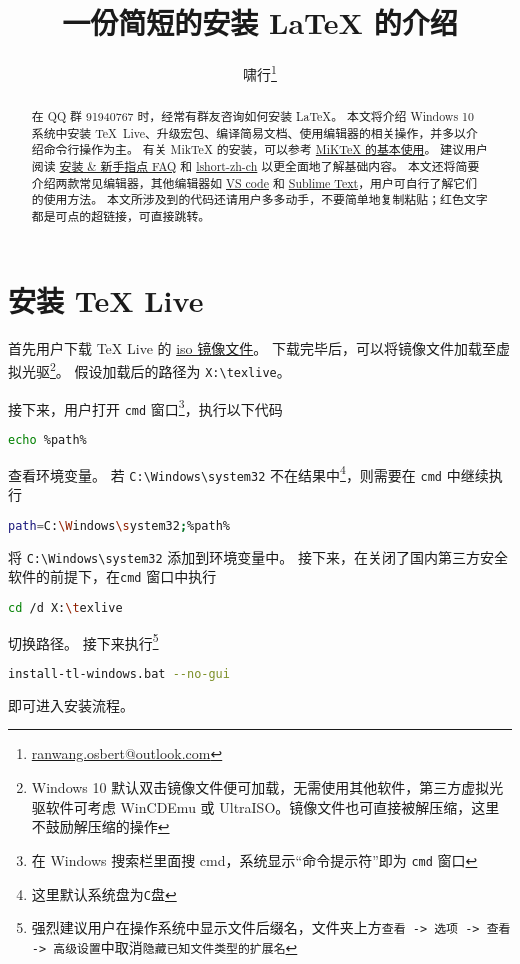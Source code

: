 \documentclass{ctexart}
\title{\bfseries 一份简短的安装 \LaTeX{} 的介绍}
\author{啸行\thanks{\url{ranwang.osbert@outlook.com}}}
\begin{document}
  
\maketitle

\begin{abstract}
在 QQ 群 91940767 时，经常有群友咨询如何安装 \LaTeX{}。
本文将介绍 Windows 10 系统中安装 \TeX{}~Live、升级宏包、编译简易文档、使用编辑器的相关操作，并多以介绍命令行操作为主。
有关 Mik\TeX{} 的安装，可以参考 \href{https://camuseblog.top/2019-03-02-/MiKTeX/}{MiK\TeX{} 的基本使用}。
建议用户阅读 \href{http://www.latexstudio.net/archives/11469.html}{\LaTeXe{} 安装 \& 新手指点 FAQ} 和 \href{http://mirrors.ctan.org/info/lshort/chinese/lshort-zh-cn.pdf}{lshort-zh-ch} 以更全面地了解基础内容。
本文还将简要介绍两款常见编辑器，其他编辑器如 \href{https://github.com/EthanDeng/vscode-latex}{VS code} 和 \href{https://github.com/EthanDeng/sublime-text-latex}{Sublime Text}，用户可自行了解它们的使用方法。
本文所涉及到的代码还请用户多多动手，不要简单地复制粘贴；红色文字都是可点的超链接，可直接跳转。
\end{abstract}

\section{安装 \TeX{} Live}
首先用户下载 \TeX{} Live 的 \href{http://mirrors.ctan.org/systems/texlive/Images/texlive.iso}{iso 镜像文件}。
下载完毕后，可以将镜像文件加载至虚拟光驱\footnote{Windows 10 默认双击镜像文件便可加载，无需使用其他软件，第三方虚拟光驱软件可考虑 WinCDEmu 或 UltraISO。镜像文件也可直接被解压缩，这里不鼓励解压缩的操作}。
假设加载后的路径为 \texttt{X:\textbackslash texlive}。

接下来，用户打开 \texttt{cmd} 窗口\footnote{在 Windows 搜索栏里面搜 cmd，系统显示“命令提示符”即为 \texttt{cmd} 窗口}，执行以下代码
\begin{lstlisting}[language = bash]
  echo %path%
\end{lstlisting}
查看环境变量。
若 \texttt{C:\textbackslash Windows\textbackslash system32} 不在结果中\footnote{这里默认系统盘为\texttt{C}盘}，则需要在 \texttt{cmd} 中继续执行
\begin{lstlisting}[language = bash]
  path=C:\Windows\system32;%path%
\end{lstlisting}
将 \verb|C:\Windows\system32| 添加到环境变量中。
接下来，在关闭了国内第三方安全软件的前提下，在\texttt{cmd} 窗口中执行
\begin{lstlisting}[language = bash]
  cd /d X:\texlive
\end{lstlisting}
切换路径。
接下来执行\footnote{强烈建议用户在操作系统中显示文件后缀名，文件夹上方\texttt{查看 -> 选项 -> 查看 -> 高级设置}中取消\texttt{隐藏已知文件类型的扩展名}}
\begin{lstlisting}[language = bash]
  install-tl-windows.bat --no-gui
\end{lstlisting}
即可进入安装流程。
\end{document}
